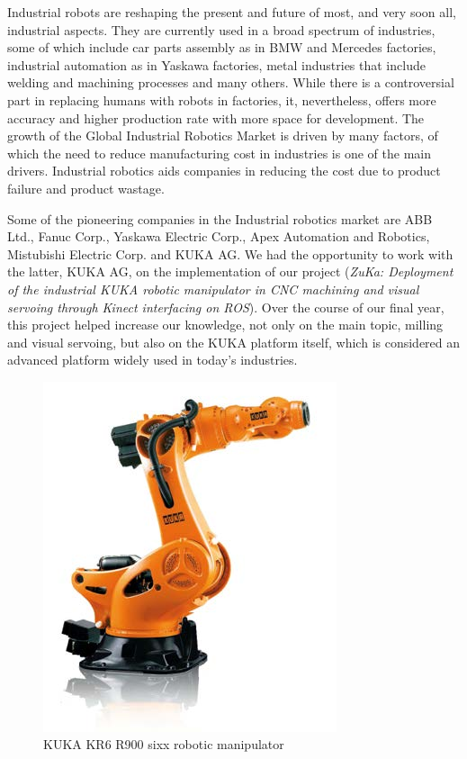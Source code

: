 %
%
		Industrial robots are reshaping the present and future of most, and very soon all, industrial aspects. They are currently used in a broad spectrum of industries, some of which include car parts assembly as in BMW and Mercedes factories, industrial automation as in Yaskawa factories, metal industries that include welding and machining processes and many others. While there is a controversial part in replacing humans with robots in factories, it, nevertheless, offers more accuracy and higher production rate with more space for development. The growth of the Global Industrial Robotics Market is driven by many factors, of which the need to reduce manufacturing cost in industries is one of the main drivers. Industrial robotics aids companies in reducing the cost due to product failure and product wastage.

\bigskip			
	Some of the pioneering companies in the Industrial robotics market are ABB Ltd., Fanuc Corp., Yaskawa Electric Corp., Apex Automation and Robotics, Mistubishi Electric Corp. and KUKA AG. We had the opportunity to work with the latter, KUKA AG, on the implementation of our project (\emph{ZuKa: Deployment of the industrial KUKA robotic manipulator in CNC machining and visual servoing through Kinect interfacing on ROS}). Over the course of our final year, this project helped increase our knowledge, not only on the main topic, milling and visual servoing, but also on the KUKA platform itself, which is considered an advanced platform widely used in today’s industries. 
\begin{figure}[h]
    \centering
    \includegraphics[width=0.7\linewidth]{figures/kuka}
    \caption{KUKA KR6 R900 sixx robotic manipulator}
    \label{fig:kuka}
\end{figure}

